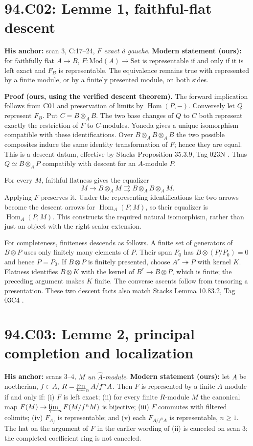 \documentclass[11pt]{article}
\newcommand{\Hom}{\operatorname{Hom}}
\begin{document}
\section{94.C02: Lemme 1, faithful-flat descent}
\label{C02}
\textbf{His anchor:} scan 3, C:17--24, \emph{$F$ exact à gauche}.
\textbf{Modern statement (ours):} for faithfully flat $A\to B$,
$F:\mathrm{Mod}(A)\to\mathrm{Set}$ is representable if and only if it is
left exact and $F_B$ is representable. The equivalence remains true with
represented by a finite module, or by a finitely presented module,
on both sides.

\textbf{Proof (ours, using the verified descent theorem).}
The forward implication follows from C01 and preservation of limits by
$\Hom(P,-)$. Conversely let $Q$ represent $F_B$. Put $C=B\otimes_A B$.
The two base changes of $Q$ to $C$ both represent exactly the restriction
of $F$ to $C$-modules. Yoneda gives a unique isomorphism compatible with
these identifications. Over $B\otimes_A B\otimes_A B$ the two possible
composites induce the same identity transformation of $F$; hence they
are equal. This is a descent datum, effective by
Stacks Proposition 35.3.9, Tag 023N \cite{Stacks023N}. Thus
$Q\simeq B\otimes_A P$ compatibly with descent for an $A$-module $P$.

For every $M$, faithful flatness gives the equalizer
\[
 M\longrightarrow B\otimes_A M
 \rightrightarrows B\otimes_A B\otimes_A M .
\]
Applying $F$ preserves it. Under the representing identifications the
two arrows become the descent arrows for $\Hom_A(P,M)$, so their
equalizer is $\Hom_A(P,M)$. This constructs the required natural
isomorphism, rather than just an object with the right scalar extension.

For completeness, finiteness descends as follows. A finite set of
generators of $B\otimes P$ uses only finitely many elements of $P$.
Their span $P_0$ has $B\otimes(P/P_0)=0$ and hence $P=P_0$.
If $B\otimes P$ is finitely presented, choose $A^r\twoheadrightarrow P$
with kernel $K$. Flatness identifies $B\otimes K$ with the kernel of
$B^r\to B\otimes P$, which is finite; the preceding argument makes $K$
finite. The converse ascents follow from tensoring a presentation.
These two descent facts also match Stacks Lemma 10.83.2, Tag 03C4
\cite{Stacks03C4}.

\section{94.C03: Lemme 2, principal completion and localization}
\label{C03}
\textbf{His anchor:} scans 3--4, \emph{$M$ un $\widehat A$-module}.
\textbf{Modern statement (ours):} let $A$ be noetherian, $f\in A$,
$R=\varprojlim_n A/f^n A$. Then $F$ is represented by a finite $A$-module
if and only if:
(i) $F$ is left exact;
(ii) for every finite $R$-module $M$ the canonical map
$F(M)\to\varprojlim_n F(M/f^nM)$ is bijective;
(iii) $F$ commutes with filtered colimits;
(iv) $F_{A_f}$ is representable; and
(v) each $F_{A/f^nA}$ is representable, $n\geq1$.
The hat on the argument of $F$ in the earlier wording of (ii) is canceled
on scan 3; the completed coefficient ring is not canceled.
\end{document}
